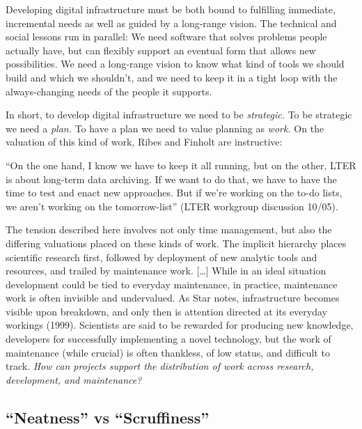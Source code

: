 Developing digital infrastructure must be both bound to fulfilling
immediate, incremental needs as well as guided by a long-range vision.
The technical and social lessons run in parallel: We need software that
solves problems people actually have, but can flexibly support an
eventual form that allows new possibilities. We need a long-range vision
to know what kind of tools we should build and which we shouldn't, and
we need to keep it in a tight loop with the always-changing needs of the
people it supports.

In short, to develop digital infrastructure we need to be
\emph{strategic.} To be strategic we need a \emph{plan.} To have a plan
we need to value planning as \emph{work.} On the valuation of this kind
of work, Ribes and Finholt are instructive:

\begin{leftbar}
``On the one hand, I know we have to keep it all running, but on the
other, LTER is about long-term data archiving. If we want to do that, we
have to have the time to test and enact new approaches. But if we're
working on the to-do lists, we aren't working on the tomorrow-list''
(LTER workgroup discussion 10/05).

The tension described here involves not only time management, but also
the differing valuations placed on these kinds of work. The implicit
hierarchy places scientific research first, followed by deployment of
new analytic tools and resources, and trailed by maintenance work.
{[}\ldots{]} While in an ideal situation development could be tied to
everyday maintenance, in practice, maintenance work is often invisible
and undervalued. As Star notes, infrastructure becomes visible upon
breakdown, and only then is attention directed at its everyday workings
(1999). Scientists are said to be rewarded for producing new knowledge,
developers for successfully implementing a novel technology, but the
work of maintenance (while crucial) is often thankless, of low status,
and difficult to track. \emph{How can projects support the distribution
of work across research, development, and maintenance?} \citep{ribesLongNowTechnology2009} 
\end{leftbar}

\hypertarget{neatness-vs-scruffiness}{%
\subsection{``Neatness'' vs
``Scruffiness''}\label{neatness-vs-scruffiness}}

